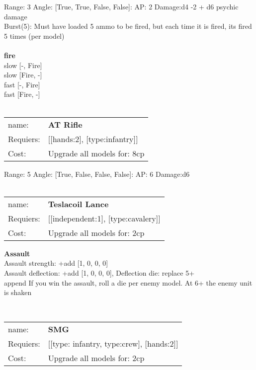 Range: 3  Angle: [True, True, False, False]: AP: 2 Damage:d4 -2 + d6 psychic damage \\
Burst(5): Must have loaded 5 ammo to be fired, but each time it is fired, its fired 5 times (per model)\\ 







\ \\ {\bf fire } \\
slow [-, Fire] \\
slow [Fire, -] \\
fast [-, Fire] \\
fast [Fire, -] \\

\ \\
\begin{tabular}{ll}
name: & {\bf AT Rifle } \\
Requiers: & [[hands:2], [type:infantry]] \\
Cost: & Upgrade all models for: 8cp \\
\end{tabular}



Range: 5  Angle: [True, False, False, False]: AP: 6 Damage:d6 \\








\ \\
\begin{tabular}{ll}
name: & {\bf Teslacoil Lance } \\
Requiers: & [[independent:1], [type:cavalery]] \\
Cost: & Upgrade all models for: 2cp \\
\end{tabular}





{\bf Assault} \ \\
Assault strength: +add [1, 0, 0, 0] 
\\ 
Assault deflection: +add [1, 0, 0, 0], Deflection die: replace 5+
\\ 

append If you win the assault, roll a die per enemy model. At 6+ the enemy unit is shaken


\ \\
\begin{tabular}{ll}
name: & {\bf SMG } \\
Requiers: & [[type: infantry, type:crew], [hands:2]] \\
Cost: & Upgrade all models for: 2cp \\
\end{tabular}



